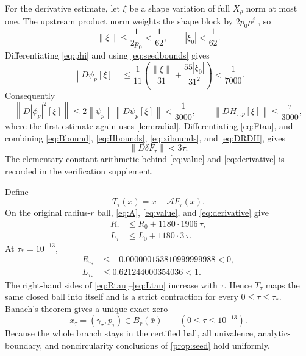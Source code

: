 \documentclass[11pt]{amsart}
\newcommand{\norm}[1]{\left\lVert #1\right\rVert}
\newcommand{\abs}[1]{\left\lvert #1\right\rvert}
\begin{document}
For the derivative estimate, let $\xi$ be a shape variation of full
$X_\rho$ norm at most one.  The upstream product norm weights the shape
block by $2\bar p_0\rho^j$
\cite[Validation Specification, Eq.~(13)]{ColbrookStepaniantsCert2026},
so
\begin{equation}\label{eq:xibounds}
  \norm\xi\le\frac1{2\bar p_0}<\frac1{62},
  \qquad
  \abs{\xi_0}<\frac1{62}.
\end{equation}
Differentiating \eqref{eq:phi} and using \eqref{eq:seedbounds} gives
\begin{equation}\label{eq:Dpsi}
  \norm{D\psi_p[\xi]}
  \le\frac1{11}
  \left(\frac{\norm\xi}{31}
  +\frac{55\abs{\xi_0}}{31^2}\right)
  <\frac1{7000}.
\end{equation}
Consequently
\begin{equation}\label{eq:DRDH}
  \norm{D\abs{\phi_p}^2[\xi]}
  \le2\norm{\psi_p}\norm{D\psi_p[\xi]}
  <\frac1{3000},
  \qquad
  \norm{DH_{\tau,p}[\xi]}\le\frac\tau{3000},
\end{equation}
where the first estimate again uses \cref{lem:radial}.
Differentiating \eqref{eq:Ftau}, and combining
\eqref{eq:Bbound}, \eqref{eq:Hbounds}, \eqref{eq:xibounds}, and
\eqref{eq:DRDH}, gives
\begin{equation}\label{eq:derivative}
  \boxed{\norm{D\delta F_\tau}<3\tau.}
\end{equation}
The elementary constant arithmetic behind \eqref{eq:value} and
\eqref{eq:derivative} is recorded in the verification supplement.

Define
\[
  T_\tau(x)=x-\mathcal AF_\tau(x).
\]
On the original radius-$r$ ball,
\eqref{eq:A}, \eqref{eq:value}, and \eqref{eq:derivative} give
\begin{align}
  R_\tau&\le R_0+1180\cdot1906\,\tau,
  \label{eq:Rtau}\\
  L_\tau&\le L_0+1180\cdot3\,\tau.
  \label{eq:Ltau}
\end{align}
At $\tau_*=10^{-13}$,
\begin{align}
  R_{\tau_*}
  &\le-0.000000153810999999988<0,
  \label{eq:Rend}\\
  L_{\tau_*}
  &\le0.621244000354036<1.
  \label{eq:Lend}
\end{align}
The right-hand sides of \eqref{eq:Rtau}--\eqref{eq:Ltau} increase with
$\tau$.  Hence $T_\tau$ maps the same closed ball into itself and is a
strict contraction for every $0\le\tau\le\tau_*$.  Banach's theorem gives a
unique exact zero
\begin{equation}\label{eq:branch}
  x_\tau=(\gamma_\tau,p_\tau)\in B_r(\bar x)
  \qquad(0\le\tau\le10^{-13}).
\end{equation}
Because the whole branch stays in the certified ball, all univalence,
analytic-boundary, and noncircularity conclusions of
\cref{prop:seed} hold uniformly.
\end{document}
